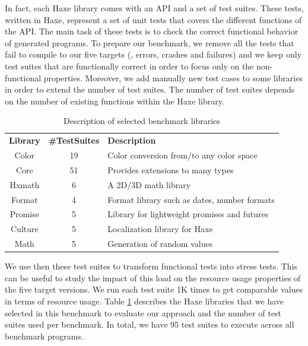 In fact, each Haxe library comes with an API and a set of test suites. These tests, written in Haxe, represent a set of unit tests that covers the different functions of the API. The main task of these tests is to check the correct functional behavior of generated programs. To prepare our benchmark, we remove all the tests that fail to compile to our five targets (\ie, errors, crashes and failures) and we keep only test suites that are functionally correct in order to focus only on the non-functional properties.
Moreover, we add manually new test cases to some libraries in order to extend the number of test suites. The number of test suites depends on the number of existing functions within the Haxe library.


\begin{table}[h]
	\centering
	
	\begin{tabular}{|c|c|p{8.5cm}|}				
		\hline
		\textbf{Library} & \textbf{\#TestSuites} & \textbf{Description} \\
		\hhline{|=|=|=|}
		Color  &  19 &  Color conversion from/to any color space   \\ \hline
		Core & 51  & Provides extensions to many types  \\ \hline
		Hxmath & 6  & A 2D/3D math library  \\ \hline
		Format  &  4 & Format library such as dates, number formats   \\ \hline
		Promise & 5  & Library for lightweight promises and futures  \\ \hline
		Culture & 5  & Localization library for Haxe \\ \hline
		Math & 5  & Generation of random values \\ \hline
	\end{tabular}
	
	\caption{Description of selected benchmark libraries}
	\label{tab:Description of selected benchmark libraries}
\end{table}

We use then these test suites to transform functional tests into stress tests. This can be useful to study the impact of this load on the resource usage properties of the five target versions. 
We run each test suite 1K times to get comparable values in terms of resource usage.
Table \ref{tab:Description of selected benchmark libraries} describes the Haxe libraries that we have selected in this benchmark to evaluate our approach and the number of test suites used per benchmark.
In total, we have 95 test suites to execute across all benchmark programs.

